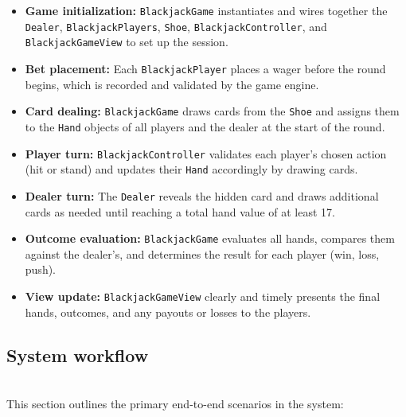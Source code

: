 \begin{itemize}
\item
\protect{}\label{prLe3dDA0NSQBDoaKs9Vb}
\textbf{Game initialization:} \texttt{BlackjackGame} instantiates and wires together the \texttt{Dealer}, \texttt{BlackjackPlayers}, \texttt{Shoe}, \texttt{BlackjackController}, and \texttt{BlackjackGameView} to set up the session.
\item
\protect{}\label{eQ8576tjiV_uqscwqckBd}
\textbf{Bet placement:} Each \texttt{BlackjackPlayer} places a wager before the round begins, which is recorded and validated by the game engine.
\item
\protect{}\label{_yaIgF_MWTntPafgZjXWc}
\textbf{Card dealing:} \texttt{BlackjackGame} draws cards from the \texttt{Shoe} and assigns them to the \texttt{Hand} objects of all players and the dealer at the start of the round.
\item
\protect{}\label{tJJxJd1B6gkOP3egGA_v6}
\textbf{Player turn:} \texttt{BlackjackController} validates each player's chosen action (hit or stand) and updates their \texttt{Hand} accordingly by drawing cards.
\item
\protect{}\label{hLe_0ycgp3AlWnzuy6X4D}
\textbf{Dealer turn:} The \texttt{Dealer} reveals the hidden card and draws additional cards as needed until reaching a total hand value of at least 17.
\item
\protect{}\label{-ATMRZb71ltYengr0JHqR}
\textbf{Outcome evaluation:} \texttt{BlackjackGame} evaluates all hands, compares them against the dealer's, and determines the result for each player (win, loss, push).
\item
\protect{}\label{cTFI_jmcPv9m-Dvbi5UJi}
\textbf{View update:} \texttt{BlackjackGameView} clearly and timely presents the final hands, outcomes, and any payouts or losses to the players.
\end{itemize}

\subsection{System workflow}\label{9uHvpIa24EmyvQwr2OrwG}
\\
This section outlines the primary end-to-end scenarios in the system:

